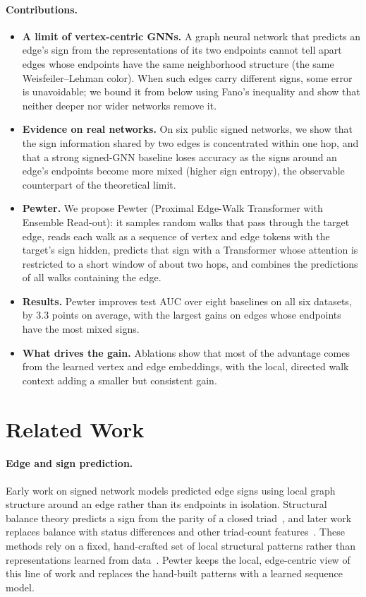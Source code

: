 \documentclass[sigconf]{acmart}
\theoremstyle{plain}
\theoremstyle{definition}
\begin{document}
\paragraph{Contributions.}
\begin{itemize}
\item \textbf{A limit of vertex-centric GNNs.} A graph neural network that predicts an edge's sign from the representations of its two endpoints cannot tell apart edges whose endpoints have the same neighborhood structure (the same Weisfeiler--Lehman color). When such edges carry different signs, some error is unavoidable; we bound it from below using Fano's inequality and show that neither deeper nor wider networks remove it.
\item \textbf{Evidence on real networks.} On six public signed networks, we show that the sign information shared by two edges is concentrated within one hop, and that a strong signed-GNN baseline loses accuracy as the signs around an edge's endpoints become more mixed (higher sign entropy), the observable counterpart of the theoretical limit.
\item \textbf{Pewter.} We propose Pewter (Proximal Edge-Walk Transformer with Ensemble Read-out): it samples random walks that pass through the target edge, reads each walk as a sequence of vertex and edge tokens with the target's sign hidden, predicts that sign with a Transformer whose attention is restricted to a short window of about two hops, and combines the predictions of all walks containing the edge.
\item \textbf{Results.} Pewter improves test AUC over eight baselines on all six datasets, by $3.3$ points on average, with the largest gains on edges whose endpoints have the most mixed signs.
\item \textbf{What drives the gain.} Ablations show that most of the advantage comes from the learned vertex and edge embeddings, with the local, directed walk context adding a smaller but consistent gain.
\end{itemize}

\section{Related Work}
\paragraph{Edge and sign prediction.} Early work on signed network models predicted edge signs using local graph structure around an edge rather than its endpoints in isolation. Structural balance theory predicts a sign from the parity of a closed triad~\citep{cartwright1956structural}, and later work replaces balance with status differences and other triad-count features~\citep{leskovec2010predicting}. These methods rely on a fixed, hand-crafted set of local structural patterns rather than representations learned from data~\citep{naaman2019edge}. Pewter keeps the local, edge-centric view of this line of work and replaces the hand-built patterns with a learned sequence model.
\end{document}

